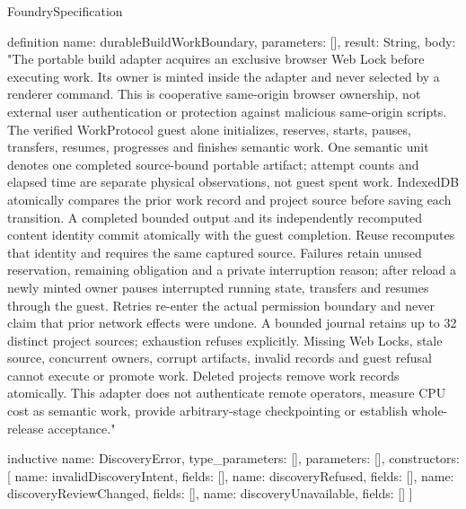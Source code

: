 \begin{lexlean}{FoundrySpecification}
\begin{semanticmodule}
definition{
  name: durableBuildWorkBoundary,
  parameters: [],
  result: String,
  body: "The portable build adapter acquires an exclusive browser Web Lock before executing work. Its owner is minted inside the adapter and never selected by a renderer command. This is cooperative same-origin browser ownership, not external user authentication or protection against malicious same-origin scripts. The verified WorkProtocol guest alone initializes, reserves, starts, pauses, transfers, resumes, progresses and finishes semantic work. One semantic unit denotes one completed source-bound portable artifact; attempt counts and elapsed time are separate physical observations, not guest spent work. IndexedDB atomically compares the prior work record and project source before saving each transition. A completed bounded output and its independently recomputed content identity commit atomically with the guest completion. Reuse recomputes that identity and requires the same captured source. Failures retain unused reservation, remaining obligation and a private interruption reason; after reload a newly minted owner pauses interrupted running state, transfers and resumes through the guest. Retries re-enter the actual permission boundary and never claim that prior network effects were undone. A bounded journal retains up to 32 distinct project sources; exhaustion refuses explicitly. Missing Web Locks, stale source, concurrent owners, corrupt artifacts, invalid records and guest refusal cannot execute or promote work. Deleted projects remove work records atomically. This adapter does not authenticate remote operators, measure CPU cost as semantic work, provide arbitrary-stage checkpointing or establish whole-release acceptance."
}

inductive{
  name: DiscoveryError,
  type_parameters: [],
  parameters: [],
  constructors: [
    {name: invalidDiscoveryIntent, fields: []},
    {name: discoveryRefused, fields: []},
    {name: discoveryReviewChanged, fields: []},
    {name: discoveryUnavailable, fields: []}
  ]
}


\end{semanticmodule}
\end{lexlean}
